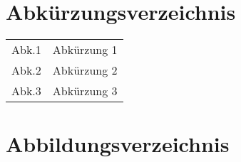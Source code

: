 \documentclass[a4paper, 11pt]{article}
\begin{document}
\newpage


\tableofcontents

\newpage


\section*{Abkürzungsverzeichnis}
\label{sec:abkuerzungsverzeichnis}

\begin{table}[!h]
\begin{tabular}{l l}
Abk.1 & Abkürzung 1 \\
Abk.2 & Abkürzung 2 \\
Abk.3 & Abkürzung 3 \\
\end{tabular}
\end{table}

\newpage


\makeatletter
\renewcommand\listoffigures{%
        \@starttoc{lof}%
}
\makeatother

\section*{Abbildungsverzeichnis}
\label{sec:abbildungsverzeichnis}

\listoffigures

\newpage


\begin{comment}
\section*{Symbolverzeichnis}
\label{sec:symbolverzeichnis}
\addcontentsline{toc}{section}{\nameref{sec:symbolverzeichnis}}

\newpage
\end{comment}


\end{document}
